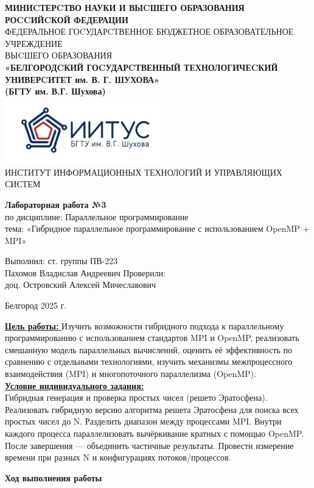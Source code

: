\documentclass[a4paper,14pt]{extarticle}
\newcommand\textbox[1]{
	\parbox{.45\textwidth}{#1}
}
\begin{document}
\begin{center}
    \small{
        \textbf{МИНИCТЕРCТВО НАУКИ И ВЫCШЕГО ОБРАЗОВАНИЯ РОCCИЙCКОЙ ФЕДЕРАЦИИ}\\
        ФЕДЕРАЛЬНОЕ ГОCУДАРCТВЕННОЕ БЮДЖЕТНОЕ ОБРАЗОВАТЕЛЬНОЕ УЧРЕЖДЕНИЕ\\ВЫCШЕГО ОБРАЗОВАНИЯ \\
        \textbf{«БЕЛГОРОДCКИЙ ГОCУДАРCТВЕННЫЙ ТЕХНОЛОГИЧЕCКИЙ\\УНИВЕРCИТЕТ им. В. Г. ШУХОВА»\\ (БГТУ им. В.Г. Шухова)} \\
        \bigbreak
        \includegraphics[width=70mm]{log}\\
        ИНСТИТУТ ИНФОРМАЦИОННЫХ ТЕХНОЛОГИЙ И УПРАВЛЯЮЩИХ СИСТЕМ\\}
\end{center}

\vfill
\begin{center}
    \large{
        \textbf{
            Лабораторная работа №3}}\\
    \normalsize{
        по дисциплине: Параллельное программирование \\
        тема: «Гибридное параллельное программирование с использованием OpenMP + MPI»}
\end{center}
\vfill
\hfill\textbox{
    Выполнил: ст. группы ПВ-223\\Пахомов Владислав Андреевич
    \bigbreak
    Проверили: \\доц. Островский Алексей Мичеславович
}
\vfill\begin{center}
    Белгород 2025 г.
\end{center}
\newpage
\underline{\textbf{Цель работы: }}Изучить возможности гибридного подхода к параллельному
программированию с использованием стандартов MPI и OpenMP, реализовать смешанную
модель параллельных вычислений, оценить её эффективность по сравнению с отдельными
технологиями, изучить механизмы межпроцессного взаимодействия (MPI) и многопоточного
параллелизма (OpenMP).\\
\underline{\textbf{Условие индивидуального задания: }}\\
Гибридная генерация и проверка простых чисел (решето Эратосфена). Реализовать
гибридную версию алгоритма решета Эратосфена для поиска всех простых чисел до N.
Разделить диапазон между процессами MPI. Внутри каждого процесса параллелизовать
вычёркивание кратных с помощью OpenMP. После завершения — объединить частичные
результаты. Провести измерение времени при разных N и конфигурациях потоков/процессов.
\begin{center}
\textbf{Ход выполнения работы}
\end{center}
\end{document}
